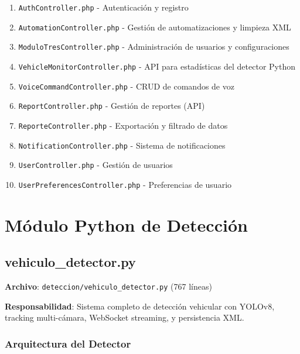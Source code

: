 \documentclass[12pt,a4paper]{article}
\begin{document}
\begin{enumerate}
    \item \texttt{AuthController.php} - Autenticación y registro
    \item \texttt{AutomationController.php} - Gestión de automatizaciones y limpieza XML
    \item \texttt{ModuloTresController.php} - Administración de usuarios y configuraciones
    \item \texttt{VehicleMonitorController.php} - API para estadísticas del detector Python
    \item \texttt{VoiceCommandController.php} - CRUD de comandos de voz
    \item \texttt{ReportController.php} - Gestión de reportes (API)
    \item \texttt{ReporteController.php} - Exportación y filtrado de datos
    \item \texttt{NotificationController.php} - Sistema de notificaciones
    \item \texttt{UserController.php} - Gestión de usuarios
    \item \texttt{UserPreferencesController.php} - Preferencias de usuario
\end{enumerate}

\newpage
\section{Módulo Python de Detección}

\subsection{vehiculo\_detector.py}

\textbf{Archivo}: \texttt{deteccion/vehiculo\_detector.py} (767 líneas)

\textbf{Responsabilidad}: Sistema completo de detección vehicular con YOLOv8, tracking multi-cámara, WebSocket streaming,  y persistencia XML.

\subsubsection{Arquitectura del Detector}
\end{document}
